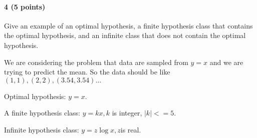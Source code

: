 \documentclass[11pt]{article}
\begin{document}
\paragraph{4 (5 points)} 
Give an example of an optimal hypothesis, a finite hypothesis class that contains the optimal hypothesis, and an infinite class that does not contain the optimal hypothesis.

We are considering the problem that data are sampled from $y=x$ and we are trying to predict the mean. So the data should be like $(1,1), (2,2), (3.54,3.54) \dots$

Optimal hypothesis: $y = x$.

A finite hypothesis class: $y = kx, k$ is integer, $|k| <= 5$.

Infinite hypothesis class: $y = z\log x, z$is real. 
\end{document}
